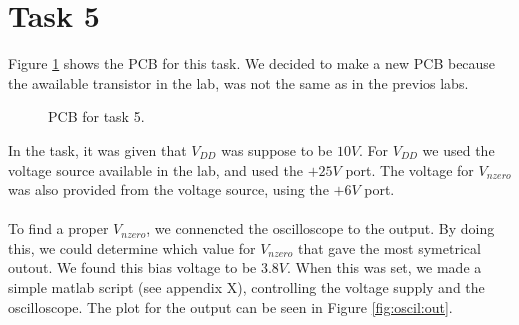 \documentclass[a4paper,english,11pt]{article}
\begin{document}
\section{Task 5}
Figure \ref{fig:pcb} shows the PCB for this task. We decided to make a new PCB because the awailable transistor in the lab, was not the same as in the previos labs.
\begin{figure}[!htbp]
 \centering
  \caption{PCB for task 5.}
  \label{fig:pcb}	
\end{figure}
In the task, it was given that $V_{DD}$ was suppose to be $10 V$. For $V_{DD}$ we used the voltage source available in the lab, and used the $+ 25V$ port.
The voltage for $V_{nzero}$ was also provided from the voltage source, using the $+ 6V$ port.\\
\\
To find a proper $V_{nzero}$, we connencted the oscilloscope to the output. By doing this, we could determine which value for $V_{nzero}$ that gave the 
most symetrical outout. We found this bias voltage to be $3.8V$. When this was set, we made a simple matlab script (see appendix X), controlling the 
voltage supply and the oscilloscope. The plot for the output can be seen in Figure \ref{fig:oscil:out}.\\
\end{document}
